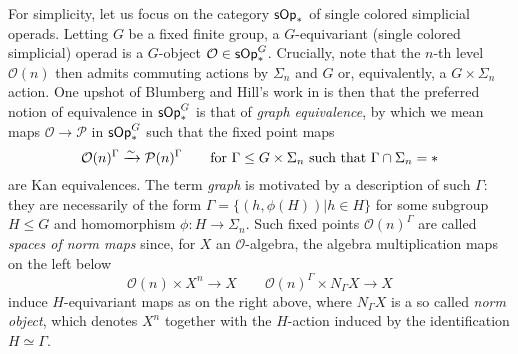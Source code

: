 \documentclass[a4paper,10pt
,draft
]{article}%
\numberwithin{equation}{section}
\numberwithin{figure}{section}
\theoremstyle{definition} %
\newtheorem{remark}[equation]{Remark}%
\newcommand{\set}[1]{\left\{#1\right\}}%
\newcommand{\longto}{\longrightarrow}%
\newcommand{\vect}[1]{\text{\overrightharp{\ensuremath{#1}}}}
\DeclareMathOperator{\Hom}{Hom}%
\renewcommand{\O}{\ensuremath{\mathcal O}}
\newcommand{\1}{\ensuremath{\mathbbm 1}}%
\begin{document}
For simplicity,
let us focus on the category
$\mathsf{sOp}_{\**}$
of single colored simplicial operads.
Letting $G$ be a fixed finite group,
a $G$-equivariant (single colored simplicial) operad
is a $G$-object
$\O \in \mathsf{sOp}_{\**}^G$.
Crucially, 
note that the $n$-th level
$\O(n)$ then admits commuting actions
by $\Sigma_n$ and $G$ or, equivalently,
a $G \times \Sigma_n$ action.
One upshot of Blumberg and Hill's work in 
\cite{BH15}
is then that the preferred notion of equivalence
in $\mathsf{sOp}_{\**}^G$
is that of \emph{graph equivalence},
by which we mean maps
$\mathcal{O} \to \mathcal{P}$
in $\mathsf{sOp}_{\**}^G$
such that the fixed point maps
\begin{equation}\label{NORMMAP EQ}
	\mathcal{O}(n)^{\Gamma}
	\xrightarrow{\sim}
	\mathcal{P}(n)^{\Gamma}
\qquad
	\text{for }
	\Gamma \leq G \times \Sigma_n
	\text{ such that }
	\Gamma \cap \Sigma_n = \**
\end{equation}
are Kan equivalences.
%
The term \emph{graph} is motivated by a description of such $\Gamma$:
they are necessarily of the form
$\Gamma = \{(h,\phi(H)) | h \in H\}$
for some subgroup $H \leq G$
and homomorphism $\phi \colon H \to \Sigma_n$.
Such fixed points $\mathcal{O}(n)^{\Gamma}$
are called 
\emph{spaces of norm maps}
since, for $X$ an $\O$-algebra,
the algebra multiplication maps
on the left below
\[
	\O(n) \times X^n \to X
\qquad
	\O(n)^{\Gamma} \times N_{\Gamma} X \to X
\]
induce $H$-equivariant maps as on the right above,
where 
$N_{\Gamma} X$ is a so called 
\emph{norm object},
which denotes $X^n$ together with the $H$-action induced by the identification $H \simeq \Gamma$.
\end{document}
